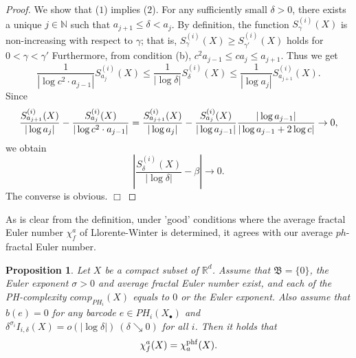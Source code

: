 \documentclass[12pt]{amsart}
\numberwithin{equation}{section}
\def\qed{\hfill $\Box$}
\def\qed{\hfill $\Box$}
\newtheorem{prop}[thm]{\bf Proposition}
\begin{document}
\begin{proof}
    We show that ($1$) implies ($2$). 
    For any sufficiently small $\delta > 0$, there exists a unique $j \in \mathbb{N}$ such that $a_{j+1} \leq \delta < a_j$. 
    By definition, the function $S_{\gamma}^{(i)}(X)$ is non-increasing with respect to $\gamma$; that is, $S_{\gamma}^{(i)}(X) \geq S_{\gamma'}^{(i)}(X)$ holds for $0 < \gamma < \gamma'$
    Furthermore, from condition (b), $c^2 a_{j-1} \leq c a_j \leq a_{j+1}$.
    Thus we get 
    \begin{equation*}
        \frac{1}{ \left| \log c^2 \cdot a_{j-1}\right|}S_{a_{j}}^{(i)}(X) 
        \leq 
        \frac{1}{ \left| \log \delta \right|}S_{\delta}^{(i)}(X)
        \leq 
        \frac{1}{ \left| \log a_j\right|}S_{a_{j+1}}^{(i)}(X).
    \end{equation*}
    Since 
    \begin{equation*}
        \frac{S_{a_{j+1}}^{(i)}(X)}{|\log a_j|} - \frac{S_{a_{j}}^{(i)}(X)}{| \log c^2 \cdot a_{j-1}|} = 
        \frac{S_{a_{j+1}}^{(i)}(X)}{|\log a_j|} - \frac{S_{a_{j}}^{(i)}(X)}{|\log a_{j-1} |} \frac{|\log a_{j-1}|}{|\log a_{j-1} + 2 \log c|} \notag \\
        \to 0,
    \end{equation*}
    we obtain
    \begin{equation*}
        \left| \frac{S_\delta ^{(i)}(X)}{|\log \delta |} - \beta \right| \to 0.
    \end{equation*}
    \indent
    The converse is obvious. 
    \qed
\end{proof}
\vspace{1em}
As is clear from the definition, under 'good' conditions where the average fractal Euler number $\chi_{f}^{a}$ of Llorente-Winter\cite{LW07} is determined, it agrees with our average $ph$-fractal Euler number. 

\begin{prop}
    \label{prp: the relation between phf Euler number and average fractal Euler number}
    Let $X$ be a compact subset of $\mathbb{R}^d$. 
    Assume that $\mathfrak{B} = \{0\}$, the Euler exponent $\sigma > 0$ and average fractal Euler number exist, and each of the PH-complexity $comp_{PH_i} (X)$ equals to $0$ or the Euler exponent. 
    Also assume that $b (e) = 0$ for any barcode $e \in PH_i (X_\bullet)$ and $\delta^{\sigma_i}I_{i,\delta}(X) = o(|\log \delta|)\ (\delta \searrow 0)$ for all $i$. 
    Then it holds that
    \begin{equation*}
        \chi_{f}^{a}(X) = \chi_{a}^{\rm phf} (X).
    \end{equation*}
\end{prop}
\end{document}
